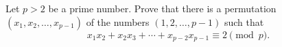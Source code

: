 Let \(p>2\) be a prime number. Prove that there is a permutation \((x_1,x_2,\ldots,x_{p-1})\) of the numbers \((1,2,\ldots,p-1)\) such that
\[
x_1x_2 + x_2x_3 + \cdots + x_{p-2}x_{p-1} \equiv 2 \pmod p.
\]
